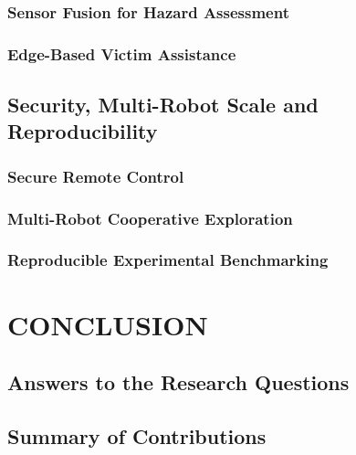 \subsection{Sensor Fusion for Hazard Assessment}
\subsection{Edge-Based Victim Assistance}
\section{Security, Multi-Robot Scale and Reproducibility}
\subsection{Secure Remote Control}
\subsection{Multi-Robot Cooperative Exploration}
\subsection{Reproducible Experimental Benchmarking}

\chapter{CONCLUSION}
\section{Answers to the Research Questions}
\section{Summary of Contributions}

